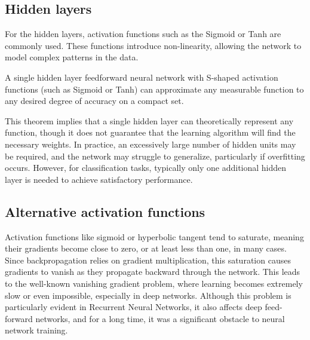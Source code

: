 \subsection{Hidden layers}
For the hidden layers, activation functions such as the Sigmoid or Tanh are commonly used. 
These functions introduce non-linearity, allowing the network to model complex patterns in the data.
\begin{theorem}
    A single hidden layer feedforward neural network with S-shaped activation functions (such as Sigmoid or Tanh) can approximate any measurable function to any desired degree of accuracy on a compact set.
\end{theorem}
This theorem implies that a single hidden layer can theoretically represent any function, though it does not guarantee that the learning algorithm will find the necessary weights. 
In practice, an excessively large number of hidden units may be required, and the network may struggle to generalize, particularly if overfitting occurs. 
However, for classification tasks, typically only one additional hidden layer is needed to achieve satisfactory performance.

\subsection{Alternative activation functions}
Activation functions like sigmoid or hyperbolic tangent tend to saturate, meaning their gradients become close to zero, or at least less than one, in many cases. 
Since backpropagation relies on gradient multiplication, this saturation causes gradients to vanish as they propagate backward through the network. 
This leads to the well-known vanishing gradient problem, where learning becomes extremely slow or even impossible, especially in deep networks. 
Although this problem is particularly evident in Recurrent Neural Networks, it also affects deep feed-forward networks, and for a long time, it was a significant obstacle to neural network training.

